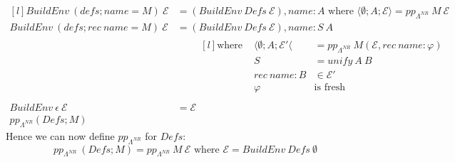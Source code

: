 \[\begin{matrix*}[l]
		BuildEnv \ (defs; name = M) \ \mathcal{E} & = (BuildEnv \ Defs \ \mathcal{E}), name: A \text{ where } \langle \emptyset ; A ; \mathcal{E} \rangle = pp_{\Lambda^{NR}} \ M \ \mathcal{E} \\
		BuildEnv \ (defs; rec \ name = M) \ \mathcal{E} & = (BuildEnv \ Defs \ \mathcal{E}), name : S \ A \\
		& \qquad \begin{matrix*}[l]
			\text{where } & \langle \emptyset ; A ; \mathcal{E}' \langle & = pp_{\Lambda^{NR}} \ M (\mathcal{E}, rec \ name: \varphi) \\
			& S &= unify \ A \ B \\
			& rec \ name: B & \in \mathcal{E}' \\
			& \varphi & \text{is fresh} \\
		\end{matrix*} \\
		BuildEnv \ \epsilon \ \mathcal{E} & = \mathcal{E} \\
		pp_{\Lambda^{NR}} (Defs ; M)
	\end{matrix*}\]
Hence we can now define $pp_{\Lambda^{NR}}$ for $Defs$:
\[pp_{\Lambda^{NR}} \ (Defs; M) = pp_{\Lambda^{NR}} \ M \ \mathcal{E} \text{ where } \mathcal{E} = BuildEnv \ Defs \ \emptyset\]
